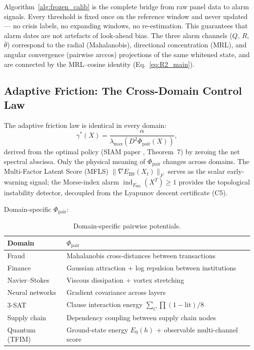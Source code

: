 \documentclass[11pt,a4paper]{article}
\newcommand{\Ebs}{E_{\mathrm{BS}}}
\newcommand{\lmax}{\lambda_{\max}}
\newcommand{\grad}{\nabla}
\newcommand{\norm}[1]{\|#1\|}
\DeclareMathOperator{\ind}{ind}
\begin{document}
\noindent
Algorithm~\ref{alg:frozen_calib} is the complete bridge from raw panel
data to alarm signals.  Every threshold is fixed once on the reference
window and never updated --- no crisis labels, no expanding windows, no
re-estimation.  This guarantees that alarm dates are not artefacts of
look-ahead bias.  The three alarm channels ($Q$, $R$, $\bar\theta$)
correspond to the radial (Mahalanobis), directional concentration (MRL),
and angular convergence (pairwise arccos) projections of the same
whitened state, and are connected by the MRL--cosine identity
(Eq.~\ref{eq:R2_main}).

\subsection{Adaptive Friction: The Cross-Domain Control Law}

The adaptive friction law is identical in every domain:
\begin{equation}\label{eq:friction}
  \gamma^*(X) = \frac{\alpha}{\lmax(D^2\Phi_{\mathrm{pair}}(X))},
\end{equation}
derived from the optimal policy (SIAM paper \cite{odeyemi2026siam},
Theorem~7) by zeroing the net spectral abscissa.  Only the
physical meaning of $\Phi_{\mathrm{pair}}$ changes across domains.
The Multi-Factor Latent Score (MFLS)
$\norm{\grad\Ebs(X_t)}_F$ serves as the scalar early-warning signal;
the Morse-index alarm
$\ind_{\Ebs}(X^T)\ge 1$ provides the topological instability
detector, decoupled from the Lyapunov descent certificate (C5).

Domain-specific $\Phi_{\mathrm{pair}}$:

\begin{table}[H]
\centering
\caption{Domain-specific pairwise potentials.}
\label{tab:potentials}
\begin{tabular}{@{}ll@{}}
\toprule
\textbf{Domain} & $\Phi_{\mathrm{pair}}$ \\
\midrule
Fraud & Mahalanobis cross-distances between transactions \\
Finance & Gaussian attraction + log repulsion between institutions \\
Navier--Stokes & Viscous dissipation + vortex stretching \\
Neural networks & Gradient covariance across layers \\
3-SAT & Clause interaction energy $\sum_C \prod (1 - \mathrm{lit})/8$ \\
Supply chain & Dependency coupling between supply chain nodes \\
Quantum (TFIM) & Ground-state energy $E_0(h)$ + observable multi-channel score \\
\bottomrule
\end{tabular}
\end{table}
\end{document}
